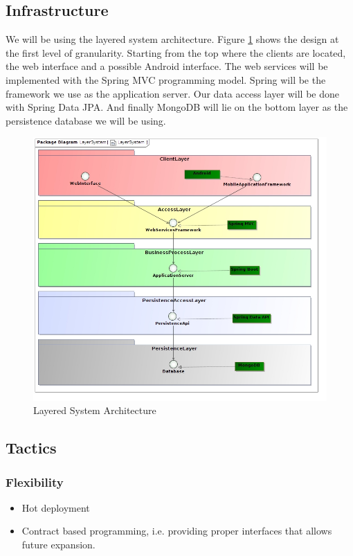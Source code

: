 \documentclass[hidelinks,english]{article}
\begin{document}
		\subsection{Infrastructure}
			We will be using the layered system architecture. Figure \ref{LayeredAchitecture} shows the design at the first level of granularity. Starting from the top where the clients are located, the web interface and a possible Android interface. The web services will be implemented with the Spring MVC programming model. Spring will be the framework we use as the application server. Our data access layer will be done with Spring Data JPA. And finally MongoDB will lie on the bottom layer as the persistence database we will be using.
			\begin{figure}[!h]
				\includegraphics[width=\linewidth]{LayerSystem.jpg}
				\caption{Layered System Architecture}
				\label{LayeredAchitecture}
			\end{figure}
		
		\subsection{Tactics}
			\subsubsection{Flexibility}
				\begin{itemize}
					\item Hot deployment
					\item Contract based programming, i.e. providing proper interfaces that allows future expansion.
				\end{itemize}
			
\end{document}
